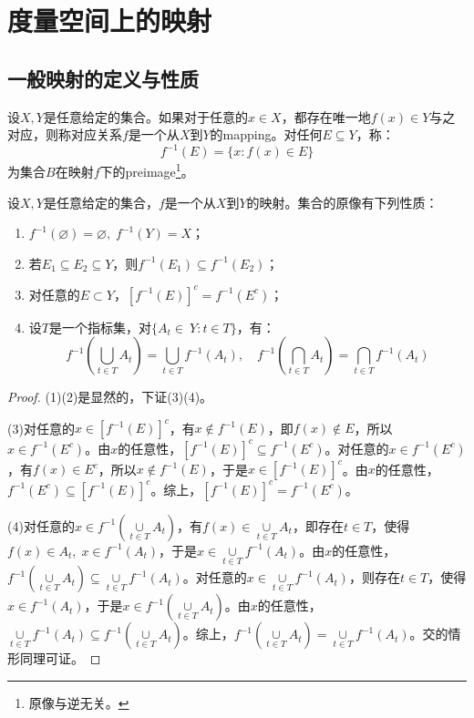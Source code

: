 \section{度量空间上的映射}
\subsection{一般映射的定义与性质}
\begin{definition}
	设$X,Y$是任意给定的集合。如果对于任意的$x\in X$，都存在唯一地$f(x)\in Y$与之对应，则称对应关系$f$是一个从$X$到$Y$的\gls{mapping}。对任何$E\subseteq Y$，称：
	\begin{equation*}
		f^{-1}(E)=\{x:f(x)\in E\}
	\end{equation*}
	为集合$B$在映射$f$下的\gls{preimage}\footnote{原像与逆无关。}。
\end{definition}
\begin{theorem}\label{theo:PropertyOfPreimage}
	设$X,Y$是任意给定的集合，$f$是一个从$X$到$Y$的映射。集合的原像有下列性质：
	\begin{enumerate}
		\item $f^{-1}(\varnothing)=\varnothing,\;f^{-1}(Y)=X$；
		\item 若$E_1\subseteq E_2\subseteq Y$，则$f^{-1}(E_1)\subseteq f^{-1}(E_2)$；
		\item 对任意的$E\subset Y$，$[f^{-1}(E)]^c=f^{-1}(E^c)$；
		\item 设$T$是一个指标集，对$\{A_t\in\ Y:t\in T\}$，有：
		\begin{equation*}
			f^{-1}\left(\underset{t\in T}{\bigcup}A_t\right)=\underset{t\in T}{\bigcup}f^{-1}(A_t), \quad
			f^{-1}\left(\underset{t\in T}{\bigcap}A_t\right)=\underset{t\in T}{\bigcap}f^{-1}(A_t)
		\end{equation*}
	\end{enumerate}
\end{theorem}
\begin{proof}
	(1)(2)是显然的，下证(3)(4)。\par
	(3)对任意的$x\in[f^{-1}(E)]^c$，有$x\notin f^{-1}(E)$，即$f(x)\notin E$，所以$x\in f^{-1}(E^c)$。由$x$的任意性，$[f^{-1}(E)]^c\subseteq f^{-1}(E^c)$。对任意的$x\in f^{-1}(E^c)$，有$f(x)\in E^c$，所以$x\notin f^{-1}(E)$，于是$x\in[f^{-1}(E)]^c$。由$x$的任意性，$f^{-1}(E^c)\subseteq[f^{-1}(E)]^c$。综上，$[f^{-1}(E)]^c=f^{-1}(E^c)$。\par
	(4)对任意的$x\in f^{-1}\left(\underset{t\in T}{\cup}A_t\right)$，有$f(x)\in\underset{t\in T}{\cup}A_t$，即存在$t\in T$，使得$f(x)\in A_t,\;x\in f^{-1}(A_t)$，于是$x\in\underset{t\in T}{\cup}f^{-1}(A_t)$。由$x$的任意性，$f^{-1}\left(\underset{t\in T}{\cup}A_t\right)\subseteq\underset{t\in T}{\cup}f^{-1}(A_t)$。对任意的$x\in\underset{t\in T}{\cup}f^{-1}(A_t)$，则存在$t\in T$，使得$x\in f^{-1}(A_t)$，于是$x\in f^{-1}\left(\underset{t\in T}{\cup}A_t\right)$。由$x$的任意性，$\underset{t\in T}{\cup}f^{-1}(A_t)\subseteq f^{-1}\left(\underset{t\in T}{\cup}A_t\right)$。综上，$f^{-1}\left(\underset{t\in T}{\cup}A_t\right)=\underset{t\in T}{\cup}f^{-1}(A_t)$。交的情形同理可证。
\end{proof}
